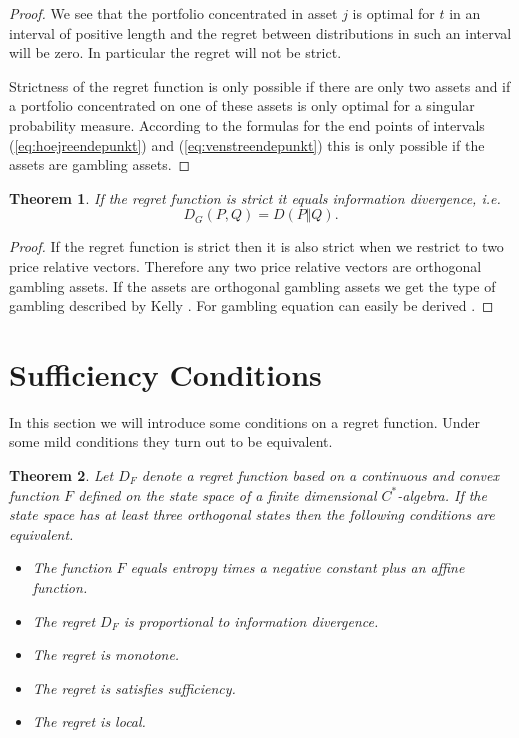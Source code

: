 \documentclass[10pt,a4paper,draft]{article}
\newtheorem{thm}{Theorem}
\begin{document}
\begin{proof}
We see that the portfolio concentrated in asset $j$ is optimal
for
$t$ in an interval of positive length and the regret between distributions in such an interval will be zero. In particular the regret will not be strict.

Strictness of the regret function is only possible if there are only two assets and if a portfolio concentrated on one of these assets is only optimal for a singular probability measure. According to the formulas for the end points of intervals (\ref{eq:hoejreendepunkt}) and (\ref{eq:venstreendepunkt}) this is only possible if the assets are gambling assets.
\end{proof}

\begin{thm}\label{strict}
If the regret function is strict it equals information divergence, i.e.
\begin{equation}
D_G (P,Q)=D\left(P\Vert Q\right).\label{eq:perfekt}
\end{equation}
\end{thm}
\begin{proof}
If the regret function is strict then it is also strict when we restrict to two price relative vectors. Therefore any two price relative vectors are orthogonal gambling assets. If the assets are orthogonal gambling assets we get the type of
gambling described by Kelly \cite{Kelly1956}. For gambling equation can easily be derived \cite{Cover1991}.
\end{proof}
 
\section{Sufficiency Conditions}

In this section we will introduce some conditions on a
regret function. Under some mild conditions they turn out to be
equivalent.
\begin{thm}
Let $D_{F}$ denote a regret function based on a continuous and convex function $F$ defined on the state space
of a finite dimensional $C^{*}$-algebra. If the state space has at
least three orthogonal states then the following conditions are equivalent.
\begin{itemize}
\item The function $F$ equals entropy times a negative constant plus an affine function.
\item The regret $D_{F}$ is proportional to information divergence.
\item The regret is monotone.
\item The regret is satisfies sufficiency.
\item The regret is local.
\end{itemize}
\end{thm}
\end{document}
